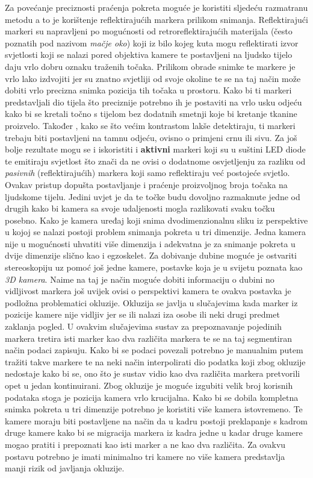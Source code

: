 \documentclass[times, utf8, diplomski]{fer}
\begin{document}
Za povećanje preciznosti praćenja pokreta moguće je koristiti sljedeću razmatranu metodu a to je korištenje reflektirajućih markera
prilikom snimanja. Reflektirajući markeri su napravljeni po mogućnosti od retroreflektirajućih materijala (često poznatih pod nazivom
\textit{mačje oko}) koji iz bilo kojeg kuta
mogu reflektirati izvor svjetlosti koji se nalazi pored objektiva kamere te postavljeni na ljudsko tijelo daju vrlo dobru oznaku
traženih točaka.
Prilikom obrade snimke te markere je vrlo lako izdvojiti jer su znatno svjetliji od svoje okoline te se na taj način može dobiti
vrlo precizna snimka pozicija tih točaka u prostoru. Kako bi ti markeri predstavljali dio tijela što preciznije potrebno ih je
postaviti na vrlo usku odjeću kako bi se kretali točno s tijelom bez dodatnih smetnji koje bi kretanje tkanine proizvelo. Također
, kako se što većim kontrastom lakše detektiraju, ti markeri trebaju biti postavljeni na tamnu odjeću, ovisno o primjeni crnu ili
sivu. Za još bolje rezultate mogu
se i iskoristiti i \textbf{aktivni} markeri koji su u suštini LED diode te emitiraju svjetlost što znači da ne ovisi o dodatnome
osvjetljenju za razliku od \textit{pasivnih} (reflektirajućih) markera koji samo reflektiraju već postojeće svjetlo. Ovakav pristup dopušta
postavljanje i praćenje proizvoljnog broja točaka na ljudskome tijelu. Jedini uvjet je da te točke budu dovoljno razmaknute jedne
od drugih kako bi kamera sa svoje udaljenosti mogla razlikovati svaku točku posebno. Kako je kamera uređaj koji snima dvodimenzionalnu
sliku iz perspektive u kojoj se nalazi postoji problem snimanja pokreta u tri dimenzije. Jedna kamera nije u mogućnosti uhvatiti
više dimenzija i adekvatna je za snimanje pokreta u dvije dimenzije slično kao i egzoskelet. Za dobivanje dubine moguće je ostvariti
stereoskopiju uz pomoć još jedne kamere, postavke koja je u svijetu poznata kao \textit{3D kamera}. Naime na taj je način moguće
dobiti informaciju o dubini no vidljivost markera još uvijek ovisi o perspektivi kamera te ovakva postavka je podložna problematici
okluzije. Okluzija se javlja u slučajevima kada marker iz pozicije kamere nije vidljiv jer se ili nalazi iza osobe ili neki drugi
predmet zaklanja pogled. U ovakvim slučajevima sustav za prepoznavanje pojedinih markera tretira isti marker kao dva različita
markera te se na taj segmentiran način podaci zapisuju. Kako bi se podaci povezali potrebno je manualnim putem tražiti takve markere
te na neki način interpolirati dio podatka koji zbog okluzije nedostaje kako bi se, ono što je sustav vidio kao dva različita
markera pretvorili opet u jedan kontinuirani. Zbog okluzije je moguće izgubiti velik broj korisnih podataka stoga je pozicija
kamera vrlo krucijalna. Kako bi se dobila kompletna snimka
pokreta u tri dimenzije potrebno je koristiti više kamera istovremeno. Te kamere moraju biti postavljene na način da u kadru postoji
preklapanje s kadrom druge kamere kako bi se migracija markera iz kadra jedne u kadar druge kamere mogao pratiti i prepoznati
kao isti marker a ne kao dva različita. Za ovakvu postavu potrebno je imati minimalno tri kamere no više kamera predstavlja
manji rizik od javljanja okluzije.
\end{document}
